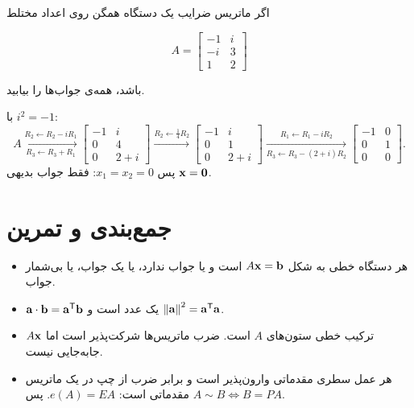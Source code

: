 \begin{example}
اگر ماتریس ضرایب یک دستگاه همگن روی اعداد مختلط
 
\[
A=\begin{bmatrix}-1&i\\-i&3\\1&2\end{bmatrix}
\]

باشد، همه‌ی جواب‌ها را بیابید.
\end{example}
\begin{solution}
با $i^2=-1$:
\[
A\xrightarrow[R_3\leftarrow R_3+R_1]{R_2\leftarrow R_2-iR_1}
\begin{bmatrix}-1&i\\0&4\\0&2+i\end{bmatrix}
\xrightarrow{R_2\leftarrow\frac14R_2}
\begin{bmatrix}-1&i\\0&1\\0&2+i\end{bmatrix}
\xrightarrow[R_3\leftarrow R_3-(2+i)R_2]{R_1\leftarrow R_1-iR_2}
\begin{bmatrix}-1&0\\0&1\\0&0\end{bmatrix}.
\]
پس $x_1=x_2=0$: فقط جواب بدیهی $\mathbf{x}=\mathbf{0}$.
\end{solution}

\section{جمع‌بندی و تمرین}

\begin{summary}
\begin{itemize}
  \item هر دستگاه خطی به شکل $A\mathbf{x}=\mathbf{b}$ است و یا جواب ندارد، یا یک جواب، یا بی‌شمار جواب.
  \item $\mathbf{a}\cdot\mathbf{b}=\mathbf{a}^{\mathsf{T}}\mathbf{b}$ یک عدد است و $\left\lVert \mathbf{a}\right\rVert^2=\mathbf{a}^{\mathsf{T}}\mathbf{a}$.
  \item $A\mathbf{x}$ ترکیب خطی ستون‌های $A$ است. ضرب ماتریس‌ها شرکت‌پذیر است اما جابه‌جایی نیست.
  \item هر عمل سطری مقدماتی وارون‌پذیر است و برابر ضرب از چپ در یک ماتریس مقدماتی است: $e(A)=EA$. پس $A\sim B\iff B=PA$.
\end{itemize}
\end{summary}

